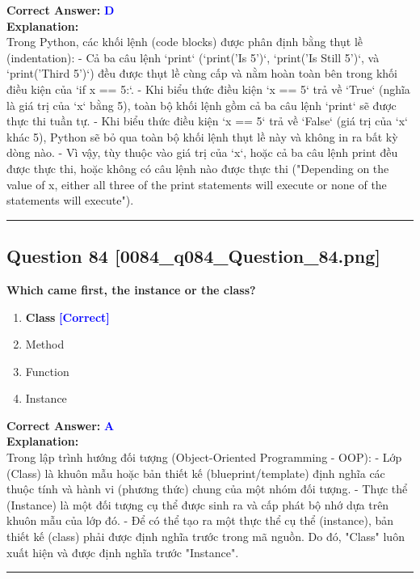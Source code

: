 \documentclass[11pt,a4paper]{article}
\begin{document}
\begin{minipage}{\textwidth}
\noindent \textbf{Correct Answer:} \textcolor{blue}{\textbf{D}} \\[4pt]
\noindent \textbf{Explanation:}\\
Trong Python, các khối lệnh (code blocks) được phân định bằng thụt lề (indentation):\newline
- Cả ba câu lệnh `print` (`print('Is 5')`, `print('Is Still 5')`, và `print('Third 5')`) đều được thụt lề cùng cấp và nằm hoàn toàn bên trong khối điều kiện của `if x == 5:`.\newline
- Khi biểu thức điều kiện `x == 5` trả về `True` (nghĩa là giá trị của `x` bằng 5), toàn bộ khối lệnh gồm cả ba câu lệnh `print` sẽ được thực thi tuần tự.\newline
- Khi biểu thức điều kiện `x == 5` trả về `False` (giá trị của `x` khác 5), Python sẽ bỏ qua toàn bộ khối lệnh thụt lề này và không in ra bất kỳ dòng nào.\newline
- Vì vậy, tùy thuộc vào giá trị của `x`, hoặc cả ba câu lệnh print đều được thực thi, hoặc không có câu lệnh nào được thực thi ("Depending on the value of x, either all three of the print statements will execute or none of the statements will execute").
\end{minipage}
\vspace{0.8cm}
\hrule
\vspace{0.5cm}

\begin{minipage}{\textwidth}
\subsection*{Question 84 \quad \footnotesize{[0084_q084_Question_84.png]}}
\noindent \textbf{Which came first, the instance or the class?}

\begin{enumerate}[label=\Alph*.]
    \item \textbf{Class} \hfill \textcolor{blue}{\textbf{[Correct]}}
    \item Method
    \item Function
    \item Instance
\end{enumerate}

\noindent \textbf{Correct Answer:} \textcolor{blue}{\textbf{A}} \\[4pt]
\noindent \textbf{Explanation:}\\
Trong lập trình hướng đối tượng (Object-Oriented Programming - OOP):\newline
- Lớp (Class) là khuôn mẫu hoặc bản thiết kế (blueprint/template) định nghĩa các thuộc tính và hành vi (phương thức) chung của một nhóm đối tượng.\newline
- Thực thể (Instance) là một đối tượng cụ thể được sinh ra và cấp phát bộ nhớ dựa trên khuôn mẫu của lớp đó.\newline
- Để có thể tạo ra một thực thể cụ thể (instance), bản thiết kế (class) phải được định nghĩa trước trong mã nguồn. Do đó, "Class" luôn xuất hiện và được định nghĩa trước "Instance".
\end{minipage}
\vspace{0.8cm}
\hrule
\vspace{0.5cm}
\end{document}

